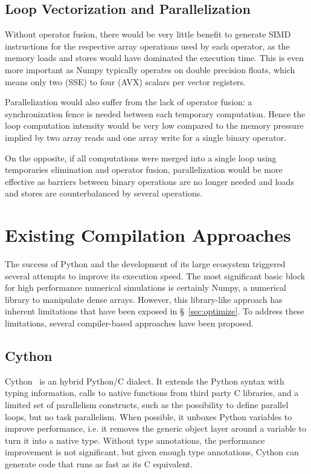 \documentclass[10pt, preprint]{sigplanconf}
\begin{document}
\subsection{Loop Vectorization and Parallelization}

Without operator fusion, there would be very little benefit to generate SIMD
instructions for the respective array operations used by each operator, as the
memory loads and stores would have dominated the execution time. This is even more important as
Numpy typically operates on double precision floats, which means only two (SSE)
to four (AVX) scalars per vector registers.

Parallelization would also suffer from the lack of operator fusion: a
synchronization fence is needed between each temporary computation.  Hence the
loop computation intensity would be very low compared to the memory pressure
implied by two array reads and one array write for a single binary operator.

On the opposite, if all computations were merged into a single loop using
temporaries elimination and operator fusion, parallelization would be more
effective as barriers between binary operations are no longer needed and loads
and stores are counterbalanced by several operations.

\section{Existing Compilation Approaches}
\label{sec:compilers}

The success of Python and the development of its large ecosystem triggered
several attempts to improve its execution speed. The most significant basic
block for high performance numerical simulations is certainly Numpy, a
numerical library to manipulate dense arrays. However, this library-like
approach has inherent limitations that have been exposed in \S~\ref{sec:optimize}.
To address these limitations, several compiler-based approaches have been proposed.


\subsection{Cython}
%
Cython~\cite{cython2010} is an hybrid Python/C dialect. It extends the Python
syntax with typing information, calls to native functions from third party C
libraries, and a limited set of parallelism constructs, such as the possibility
to define parallel loops, but no task parallelism. When possible, it unboxes
Python variables to improve performance, i.e. it removes the generic object
layer around a variable to turn it into a native type. Without type
annotations, the performance improvement is not significant, but given enough
type annotations, Cython can generate code that runs as fast as its C
equivalent.
\end{document}
